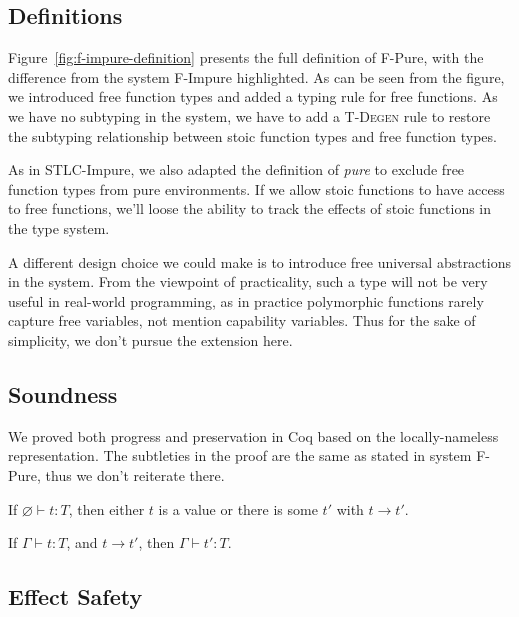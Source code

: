 \subsection{Definitions}

Figure~\ref{fig:f-impure-definition} presents the full definition of
F-Pure, with the difference from the system F-Impure highlighted. As
can be seen from the figure, we introduced free function types and
added a typing rule for free functions. As we have no subtyping in the
system, we have to add a \textsc{T-Degen} rule to restore the
subtyping relationship between stoic function types and free function
types.

As in STLC-Impure, we also adapted the definition of \emph{pure} to
exclude free function types from pure environments. If we allow stoic
functions to have access to free functions, we'll loose the ability to
track the effects of stoic functions in the type system.

A different design choice we could make is to introduce free universal
abstractions in the system. From the viewpoint of practicality, such a
type will not be very useful in real-world programming, as in practice
polymorphic functions rarely capture free variables, not mention
capability variables. Thus for the sake of simplicity, we don't pursue
the extension here.

\subsection{Soundness}

We proved both progress and preservation in Coq based on the
locally-nameless representation. The subtleties in the proof are the
same as stated in system F-Pure, thus we don't reiterate there.

\begin{theorem}[Progress]
If $\varnothing \vdash t : T$, then either $t$ is a value or there is some
$t'$ with $t \longrightarrow t'$.
\end{theorem}

\begin{theorem}[Preservation]
If $\Gamma \vdash t : T$, and $t \longrightarrow t'$, then $\Gamma
\vdash t' : T$.
\end{theorem}

\subsection{Effect Safety}

